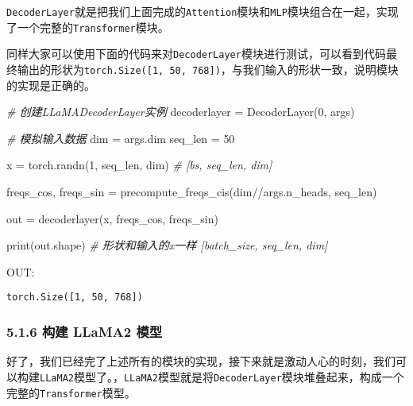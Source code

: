 \documentclass[
]{article}
\newenvironment{Shaded}{}{}
\newcommand{\BuiltInTok}[1]{\textcolor[rgb]{0.00,0.50,0.00}{#1}}
\newcommand{\CommentTok}[1]{\textcolor[rgb]{0.38,0.63,0.69}{\textit{#1}}}
\newcommand{\DecValTok}[1]{\textcolor[rgb]{0.25,0.63,0.44}{#1}}
\newcommand{\NormalTok}[1]{#1}
\newcommand{\OperatorTok}[1]{\textcolor[rgb]{0.40,0.40,0.40}{#1}}
\begin{document}
\texttt{DecoderLayer}就是把我们上面完成的\texttt{Attention}模块和\texttt{MLP}模块组合在一起，实现了一个完整的\texttt{Transformer}模块。

同样大家可以使用下面的代码来对\texttt{DecoderLayer}模块进行测试，可以看到代码最终输出的形状为\texttt{torch.Size({[}1,\ 50,\ 768{]})}，与我们输入的形状一致，说明模块的实现是正确的。

\begin{Shaded}
\begin{Highlighting}[]
\CommentTok{\# 创建LLaMADecoderLayer实例}
\NormalTok{decoderlayer }\OperatorTok{=}\NormalTok{ DecoderLayer(}\DecValTok{0}\NormalTok{, args)}

\CommentTok{\# 模拟输入数据}
\NormalTok{dim }\OperatorTok{=}\NormalTok{ args.dim}
\NormalTok{seq\_len }\OperatorTok{=} \DecValTok{50}

\NormalTok{x }\OperatorTok{=}\NormalTok{ torch.randn(}\DecValTok{1}\NormalTok{, seq\_len, dim) }\CommentTok{\# [bs, seq\_len, dim]}

\NormalTok{freqs\_cos, freqs\_sin }\OperatorTok{=}\NormalTok{ precompute\_freqs\_cis(dim}\OperatorTok{//}\NormalTok{args.n\_heads, seq\_len)}

\NormalTok{out }\OperatorTok{=}\NormalTok{ decoderlayer(x, freqs\_cos, freqs\_sin)}

\BuiltInTok{print}\NormalTok{(out.shape) }\CommentTok{\# 形状和输入的x一样 [batch\_size, seq\_len, dim]}
\end{Highlighting}
\end{Shaded}

OUT:

\begin{verbatim}
torch.Size([1, 50, 768])
\end{verbatim}

\subsubsection{5.1.6 构建 LLaMA2
模型}\label{ux6784ux5efa-llama2-ux6a21ux578b}

好了，我们已经完了上述所有的模块的实现，接下来就是激动人心的时刻，我们可以构建\texttt{LLaMA2}模型了。，\texttt{LLaMA2}模型就是将\texttt{DecoderLayer}模块堆叠起来，构成一个完整的\texttt{Transformer}模型。
\end{document}
